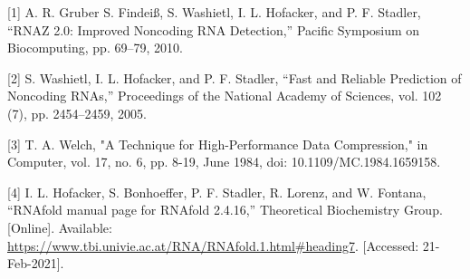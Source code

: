 \documentclass[letterpaper, 12pt]{artikel3}
\begin{document}
[1] A. R. Gruber S. Findeiß, S. Washietl, I. L. Hofacker, and P. F. Stadler, “RNAZ 2.0: Improved Noncoding RNA Detection,” Pacific Symposium on Biocomputing, pp. 69–79, 2010. 

[2] S. Washietl, I. L. Hofacker, and P. F. Stadler, “Fast and Reliable Prediction of Noncoding RNAs,” Proceedings of the National Academy of Sciences, vol. 102 (7), pp. 2454–2459, 2005.  

[3] T. A. Welch, "A Technique for High-Performance Data Compression," in Computer, vol. 17, no. 6, pp. 8-19, June 1984, doi: 10.1109/MC.1984.1659158.

[4] I. L. Hofacker, S. Bonhoeffer, P. F. Stadler, R. Lorenz, and W. Fontana, “RNAfold manual page for RNAfold 2.4.16,” Theoretical Biochemistry Group. [Online]. Available: \url{https://www.tbi.univie.ac.at/RNA/RNAfold.1.html#heading7}. [Accessed: 21-Feb-2021]. 
\end{document}
